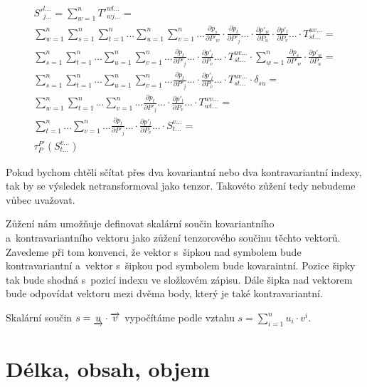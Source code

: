 \begin{equation}
\begin{split}
S'^{l...}_{j...} = \sum_{w=1}^n T'^{wl...}_{wj...} = \\
\sum_{w=1}^n \sum_{s=1}^n \sum_{t=1}^n ... \sum_{u=1}^n \sum_{v=1}^n ... \frac{\partial p_s}{\partial P'_w} \cdot \frac{\partial p_t}{\partial P'_j} ... \cdot \frac{\partial p'_w}{\partial P_u} \cdot \frac{\partial p'_l}{\partial P_v} ... \cdot T_{st...}^{uv...} = \\
\sum_{s=1}^n \sum_{t=1}^n ... \sum_{u=1}^n \sum_{v=1}^n ... \frac{\partial p_t}{\partial P'_j} ... \cdot \frac{\partial p'_l}{\partial P_v} ... \cdot T_{st...}^{uv...} \cdot \sum_{w=1}^n \frac{\partial p_s}{\partial P'_w} \cdot \frac{\partial p'_w}{\partial P_u} = \\
\sum_{s=1}^n \sum_{t=1}^n ... \sum_{u=1}^n \sum_{v=1}^n ... \frac{\partial p_t}{\partial P'_j} ... \cdot \frac{\partial p'_l}{\partial P_v} ... \cdot T_{st...}^{uv...} \cdot \delta_{su} = \\
\sum_{w=1}^n \sum_{t=1}^n ... \sum_{v=1}^n ... \frac{\partial p_t}{\partial P'_j} ... \cdot \frac{\partial p'_l}{\partial P_v} ... \cdot T_{wt...}^{wv...} = \\
\sum_{t=1}^n ... \sum_{v=1}^n ... \frac{\partial p_t}{\partial P'_j} ... \cdot \frac{\partial p'_l}{\partial P_v} ... \cdot S_{t...}^{v...} = \\
\tau_P^{P'} (S_{t...}^{v...})
\end{split}
\end{equation}

Pokud bychom chtěli sčítat přes dva kovariantní nebo dva kontravariantní indexy, tak by se výsledek netransformoval jako tenzor. Takovéto zůžení tedy nebudeme
vůbec uvažovat.

Zůžení nám umožňuje definovat skalární součin kovariantního a~kontravariantního vektoru jako zůžení tenzorového součinu těchto vektorů. Zavedeme při tom
konvenci, že vektor s~šipkou nad symbolem bude kontravariantní a~vektor s~šipkou pod symbolem bude kovaraintní. Pozice šipky tak bude shodná s~pozicí
indexu ve složkovém zápisu. Dále šipka nad vektorem bude odpovídat vektoru mezi dvěma body, který je také kontravariantní.

\begin{fact}
Skalární součin \(s = \underrightarrow{u} \cdot \overrightarrow{v}\) vypočítáme podle vztahu \(s = \sum_{i=1}^n u_i \cdot v^i\).
\end{fact}

\section{Délka, obsah, objem}

